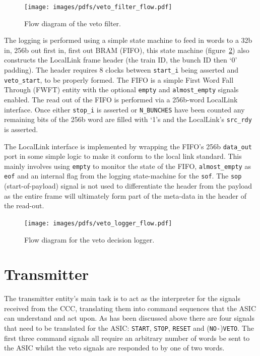 \begin{figure}[htbp]
  \centering
  \texttt{[image: images/pdfs/veto\_filter\_flow.pdf]}
  \caption{Flow diagram of the veto filter.}
  \label{fig:veto_filter_flow}
\end{figure}
    
The logging is performed using a simple state machine to feed in words to a 32b in, 256b out first in, first out BRAM (FIFO), this state machine (figure~\ref{fig:veto_logger_flow}) also constructs the LocalLink frame header (the train ID, the bunch ID then `0' padding). The header requires 8 clocks between \texttt{start\_i} being asserted and \texttt{veto\_start}, to be properly formed. The FIFO is a simple First Word Fall Through (FWFT) entity with the optional \texttt{empty} and \texttt{almost\_empty} signals enabled. The read out of the FIFO is performed via a 256b-word LocalLink interface. Once either \texttt{stop\_i} is asserted or \texttt{N\_BUNCHES} have been counted any remaining bits of the 256b word are filled with `1's and the LocalLink's \texttt{src\_rdy} is asserted. 
    
The LocalLink interface is implemented by wrapping the FIFO's 256b \texttt{data\_out} port in some simple logic to make it conform to the local link standard. This mainly involves using \texttt{empty} to monitor the state of the FIFO, \texttt{almost\_empty} as \texttt{eof} and an internal flag from the logging state-machine for the \texttt{sof}. The \texttt{sop} (start-of-payload) signal is not used to differentiate the header from the payload as the entire frame will ultimately form part of the meta-data in the header of the read-out.
    
\begin{figure}[htbp]
  \centering
  \texttt{[image: images/pdfs/veto\_logger\_flow.pdf]}
  \caption{Flow diagram for the veto decision logger.}
  \label{fig:veto_logger_flow}
\end{figure}

\section{Transmitter} %
\label{sec:transmitter}
The transmitter entity's main task is to act as the interpreter for the signals received from the CCC, translating them into command sequences that the ASIC can understand and act upon. As has been discussed above there are four signals that need to be translated for the ASIC: \texttt{START}, \texttt{STOP}, \texttt{RESET} and (\texttt{NO-})\texttt{VETO}. The first three command signals all require an arbitrary number of words be sent to the ASIC whilst the veto signals are responded to by one of two words.
    
